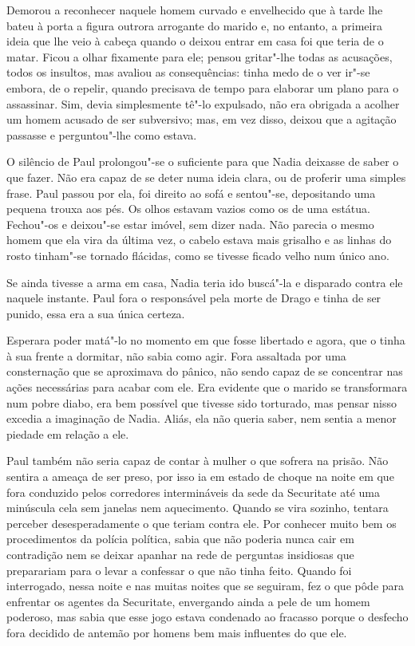 Demorou a reconhecer naquele homem curvado e envelhecido que à tarde
lhe bateu à porta a figura outrora arrogante do marido e, no entanto, a
primeira ideia que lhe veio à cabeça quando o deixou entrar em casa foi
que teria de o matar. Ficou a olhar fixamente para ele; pensou
gritar"-lhe todas as acusações, todos os insultos, mas avaliou as
consequências: tinha medo de o ver ir"-se embora, de o repelir, quando
precisava de tempo para elaborar um plano para o assassinar. Sim, devia
simplesmente tê"-lo expulsado, não era obrigada a acolher um homem
acusado de ser subversivo; mas, em vez disso, deixou que a agitação
passasse e perguntou"-lhe como estava.

O silêncio de Paul prolongou"-se o suficiente para que Nadia deixasse de
saber o que fazer. Não era capaz de se deter numa ideia clara, ou de
proferir uma simples frase. Paul passou por ela, foi direito ao sofá e
sentou"-se, depositando uma pequena trouxa aos pés. Os olhos estavam
vazios como os de uma estátua. Fechou"-os e deixou"-se estar imóvel, sem
dizer nada. Não parecia o mesmo homem que ela vira da última vez, o
cabelo estava mais grisalho e as linhas do rosto tinham"-se tornado
flácidas, como se tivesse ficado velho num único ano.

Se ainda tivesse a arma em casa, Nadia teria ido buscá"-la e disparado contra ele naquele instante. Paul fora o responsável
pela morte de Drago e tinha de ser punido, essa era a sua única certeza.

Esperara poder matá"-lo no momento em que fosse libertado e agora, que o
tinha à sua frente a dormitar, não sabia como agir. Fora assaltada por
uma consternação que se aproximava do pânico, não sendo capaz de se
concentrar nas ações necessárias para acabar com ele. Era evidente
que o marido se transformara num pobre diabo, era bem possível que
tivesse sido torturado, mas pensar nisso excedia a imaginação de Nadia.
Aliás, ela não queria saber, nem sentia a menor piedade em relação a
ele.

\bigskip

Paul também não seria capaz de contar à mulher o que sofrera na prisão.
Não sentira a ameaça de ser preso, por isso ia em estado de choque na
noite em que fora conduzido pelos corredores intermináveis da sede da
Securitate até uma minúscula cela sem janelas nem aquecimento. Quando se
vira sozinho, tentara perceber desesperadamente o que teriam contra ele. Por conhecer muito bem os procedimentos
da polícia política, sabia que não poderia nunca cair em contradição nem
se deixar apanhar na rede de perguntas insidiosas que preparariam para o
levar a confessar o que não tinha feito. Quando foi interrogado, nessa
noite e nas muitas noites que se seguiram, fez o que pôde para enfrentar
os agentes da Securitate, envergando ainda a pele de um homem poderoso,
mas sabia que esse jogo estava condenado ao fracasso porque o desfecho
fora decidido de antemão por homens bem mais influentes do que ele.

